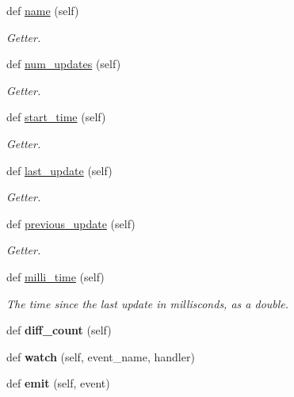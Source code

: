 \begin{DoxyCompactItemize}
def \hyperlink{classelma_1_1api_1_1process_1_1Process_affa061fab12e699d4d04471bfaf52a1a}{name} (self)
\begin{DoxyCompactList}\small\item\em Getter. \end{DoxyCompactList}\item 
def \hyperlink{classelma_1_1api_1_1process_1_1Process_ad0a58ddb9103ec226c42892e5a3d2c3f}{num\+\_\+updates} (self)
\begin{DoxyCompactList}\small\item\em Getter. \end{DoxyCompactList}\item 
def \hyperlink{classelma_1_1api_1_1process_1_1Process_aa37c2ece596b3580990332709564345f}{start\+\_\+time} (self)
\begin{DoxyCompactList}\small\item\em Getter. \end{DoxyCompactList}\item 
def \hyperlink{classelma_1_1api_1_1process_1_1Process_aef00f41f3c8bab2b49329d05ce83f534}{last\+\_\+update} (self)
\begin{DoxyCompactList}\small\item\em Getter. \end{DoxyCompactList}\item 
def \hyperlink{classelma_1_1api_1_1process_1_1Process_a47488e16165e28243766c7a6f5a51e32}{previous\+\_\+update} (self)
\begin{DoxyCompactList}\small\item\em Getter. \end{DoxyCompactList}\item 
def \hyperlink{classelma_1_1api_1_1process_1_1Process_a65c2b15f6f42435a532aafd62631cc1d}{milli\+\_\+time} (self)
\begin{DoxyCompactList}\small\item\em The time since the last update in millisconds, as a double. \end{DoxyCompactList}\item 
\mbox{\label{classelma_1_1api_1_1process_1_1Process_abbe3f746bdaa56b1166e37c6622e93f9}} 
def {\bfseries diff\+\_\+count} (self)
\item 
\mbox{\label{classelma_1_1api_1_1process_1_1Process_afb8d0a01fbbf47d20fdd97d3b9d0e2e9}} 
def {\bfseries watch} (self, event\+\_\+name, handler)
\item 
\mbox{\label{classelma_1_1api_1_1process_1_1Process_aaefd6d23649bf1bb0674dad7e2cebef8}} 
def {\bfseries emit} (self, event)
\end{DoxyCompactItemize}
